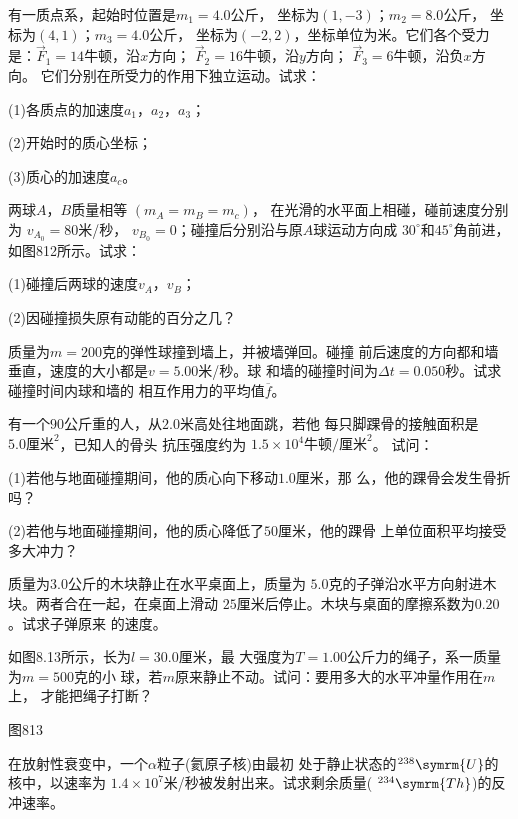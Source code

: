\begin{exercises}
\exercise 有一质点系，起始时位置是$ m _ { 1 } = 4.0 $公斤，
坐标为$ \left( 1 , -3 \right) $；$ m _ { 2 } = 8.0 $公斤，
坐标为$ \left( 4 , 1 \right) $；$ m _ { 3 } = 4.0 $公斤，
坐标为$ \left( -2 , 2 \right) $，坐标单位为米。它们各个受力
是：$ \vec { F } _ { 1 } = 14 $牛顿，沿$ x $方向；
$ \vec { F } _ { 2 } = 16 $牛顿，沿$ y $方向；
$ \vec { F } _ { 3 } = 6 $牛顿，沿负$ x $方向。
它们分别在所受力的作用下独立运动。试求：

(1)各质点的加速度$ a _ { 1 } $，$ a _ { 2 } $，$ a _ { 3 } $；

(2)开始时的质心坐标；

(3)质心的加速度$ a _ { c } $。

\exercise 两球$ A $，$ B $质量相等
$ \left( m _ { A } = m _ { B } = m _ { c } \right) $，
在光滑的水平面上相碰，碰前速度分别为
$ v _ { A _ { 0 } } = 80 $米/秒，
$ v _ { B _ { 0 } } = 0 $；碰撞后分别沿与原$ A $球运动方向成
$ 30 ^ \circ $和$ 45 ^ { \circ } $角前进，如图812所示。试求：

(1)碰撞后两球的速度$ v _ { A } $，$ v _ { B } $；

(2)因碰撞损失原有动能的百分之几？

\exercise 质量为$ m = 200 $克的弹性球撞到墙上，并被墙弹回。碰撞
前后速度的方向都和墙垂直，速度的大小都是$ v = 5.00 $米/秒。球
和墙的碰撞时间为$ \Delta t = 0.050 $秒。试求碰撞时间内球和墙的
相互作用力的平均值$ \overline { f } $。

\exercise 有一个$ 90 $公斤重的人，从$ 2.0 $米高处往地面跳，若他
每只脚踝骨的接触面积是$ 5.0 \text {厘米} ^ { 2 } $，已知人的骨头
抗压强度约为
$ 1.5 \times 10 ^ { 4 } \text {牛顿} / \text {厘米} ^ { 2 } $。
试问：

(1)若他与地面碰撞期间，他的质心向下移动$ 1.0 $厘米，那
么，他的踝骨会发生骨折吗？

(2)若他与地面碰撞期间，他的质心降低了$ 50 $厘米，他的踝骨
上单位面积平均接受多大冲力？

\exercise 质量为$ 3.0 $公斤的木块静止在水平桌面上，质量为
$ 5.0 $克的子弹沿水平方向射进木块。两者合在一起，在桌面上滑动
$ 25 $厘米后停止。木块与桌面的摩擦系数为$ 0.20 $。试求子弹原来
的速度。

\exercise 如图8.13所示，长为$ l = 30.0 $厘米，最
大强度为$ T = 1.00 $公斤力的绳子，系一质量为$ m = 500 $克的小
球，若$ m $原来静止不动。试问：要用多大的水平冲量作用在$ m $上，
才能把绳子打断？

图813

\exercise 在放射性衰变中，一个$ \alpha $粒子(氦原子核)由最初
处于静止状态的$ ^{ 238 } \symrm{U} $的核中，以速率为
$ 1.4 \times 10 ^ { 7 }$米/秒被发射出来。试求剩余质量(
$ ^{ 234 } \symrm{Th} $)的反冲速率。


\end{exercises}
